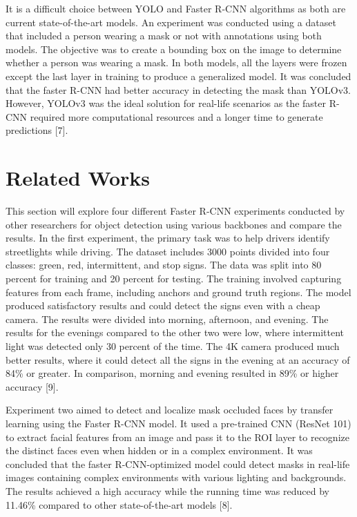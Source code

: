 \documentclass[conference]{IEEEtran}
\begin{document}
    It is a difficult choice between YOLO and Faster R-CNN algorithms as both are current state-of-the-art models. An experiment was conducted using a dataset 
    that included a person wearing a mask or not with annotations using both models. The objective was to create a bounding box on the image to determine whether 
    a person was wearing a mask. In both models, all the layers were frozen except the last layer in training to produce a generalized model. It was concluded 
    that the faster R-CNN had better accuracy in detecting the mask than YOLOv3. However, YOLOv3 was the ideal solution for real-life scenarios as the faster 
    R-CNN required more computational resources and a longer time to generate predictions [7].

    

\section{Related Works}
This section will explore four different Faster R-CNN experiments conducted by other researchers for object detection using various backbones and compare the results. 
In the first experiment, the primary task was to help drivers identify streetlights while driving. The dataset includes 3000 points divided into four classes: 
green, red, intermittent, and stop signs. The data was split into 80 percent for training and 20 percent for testing. The training involved capturing features 
from each frame, including anchors and ground truth regions. The model produced satisfactory results and could detect the signs even with a cheap camera. The results 
were divided into morning, afternoon, and evening. The results for the evenings compared to the other two were low, where intermittent light was detected only 30 percent 
of the time. The 4K camera produced much better results, where it could detect all the signs in the evening at an accuracy of 84\% or greater. In comparison, 
morning and evening resulted in 89\% or higher accuracy [9]. 

Experiment two aimed to detect and localize mask occluded faces by transfer learning using the Faster R-CNN model. It used a pre-trained CNN (ResNet 101) to extract facial features 
from an image and pass it to the ROI layer to recognize the distinct faces even when hidden or in a complex environment. It was concluded that the faster R-CNN-optimized model 
could detect masks in real-life images containing complex environments with various lighting and backgrounds. The results achieved a high accuracy while the running time was 
reduced by 11.46\% compared to other state-of-the-art models [8]. 
\end{document}
